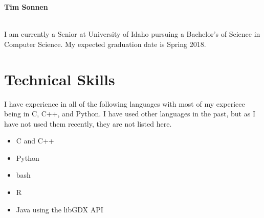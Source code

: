 \documentclass[10pt]{article}
\begin{document}
\noindent
\centerline{\textbf{Tim Sonnen}}
\centerline{}
\vspace{2mm}
\noindent
\\ I am currently a Senior at University of Idaho pursuing a Bachelor's of Science in Computer Science. My expected graduation date is Spring 2018.
\section*{Technical Skills}
	\vspace{2mm}
	\begin{adjustwidth}{5mm}{}
	I have experience in all of the following languages with most of my experiece 
	being in C, C++, and Python. I have used other languages in the past, but as 
	I have not used them recently, they are not listed here.
	  \begin{itemize}[noitemsep, nolistsep]
	  	\item C and C++
	  	\item Python
	  	\item bash
	  	\item R
	  	\item Java using the libGDX API
	  \end{itemize}
	\end{adjustwidth}
\end{document}
